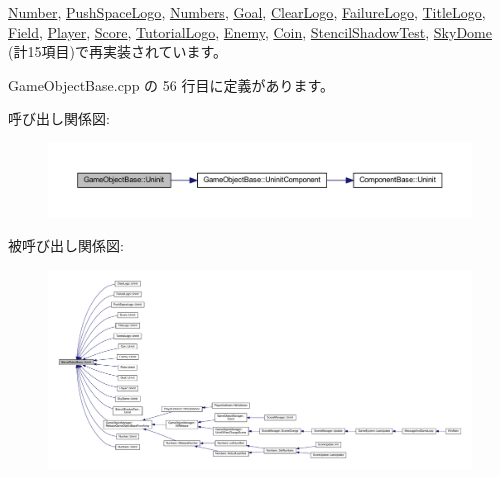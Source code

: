 \mbox{\hyperlink{class_number_a7c3bf9c55f7a0a19d80129c5f07f99f2}{Number}}, \mbox{\hyperlink{class_push_space_logo_a06404113db417c58941ca7a13bba161e}{Push\+Space\+Logo}}, \mbox{\hyperlink{class_numbers_aeaad3cc1b8ae7defe79813b983b04101}{Numbers}}, \mbox{\hyperlink{class_goal_a48126385a674bcda855e2a61561fbf9f}{Goal}}, \mbox{\hyperlink{class_clear_logo_ab55def116615b92a8e8cc40b364b7a4c}{Clear\+Logo}}, \mbox{\hyperlink{class_failure_logo_adbe01fc4567ade0e788f511f5162299c}{Failure\+Logo}}, \mbox{\hyperlink{class_title_logo_a177943b3becc80fcdb7a34f131b07ee9}{Title\+Logo}}, \mbox{\hyperlink{class_field_a6d1015e2409daa87cd00485ac1efc06b}{Field}}, \mbox{\hyperlink{class_player_a7455a83ac23d2f5e0cce0ddd7d92db0c}{Player}}, \mbox{\hyperlink{class_score_a605e163dc59ccc4d19a3cb6b5db813b8}{Score}}, \mbox{\hyperlink{class_tutorial_logo_a8e1f1dba47dadf7d1bb40f616324ffb5}{Tutorial\+Logo}}, \mbox{\hyperlink{class_enemy_a9aeaa757abdf0c37fd67c4ce5aed6962}{Enemy}}, \mbox{\hyperlink{class_coin_a4d364dcb4b57b80ea00ce931d0bb300f}{Coin}}, \mbox{\hyperlink{class_stencil_shadow_test_a51b5d75aaba5673a13f950bd6b742720}{Stencil\+Shadow\+Test}}, \mbox{\hyperlink{class_sky_dome_a7fc71bfa671cf6e7ab26a194459b0753}{Sky\+Dome}} (計15項目)で再実装されています。



 Game\+Object\+Base.\+cpp の 56 行目に定義があります。

呼び出し関係図\+:\nopagebreak
\begin{figure}[H]
\begin{center}
\leavevmode
\includegraphics[width=350pt]{class_game_object_base_a97e1bc277d7b1c0156d4735de29a022c_cgraph}
\end{center}
\end{figure}
被呼び出し関係図\+:
\nopagebreak
\begin{figure}[H]
\begin{center}
\leavevmode
\includegraphics[width=350pt]{class_game_object_base_a97e1bc277d7b1c0156d4735de29a022c_icgraph}
\end{center}
\end{figure}
\mbox{\label{class_game_object_base_aff8e4f486435f5d921c186b0824e8a0e}} 
